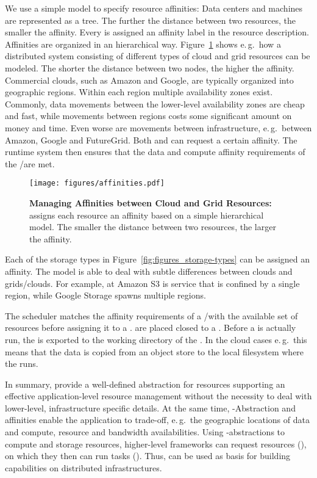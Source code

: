 \documentclass{sig-alternate}
\begin{document}
We use a simple model to specify resource affinities: Data centers and
machines are represented as a tree. The further the distance between two
resources, the smaller the affinity. Every \pilot is assigned an affinity
label in the resource description. Affinities are organized in an hierarchical
way. Figure~\ref{fig:figures_affinities} shows e.\,g.\ how a distributed
system consisting of different types of cloud and grid resources can be
modeled. The shorter the distance between two nodes, the higher the affinity.
Commercial clouds, such as Amazon and Google, are typically organized into
geographic regions. Within each region multiple availability zones exist.
Commonly, data movements between the lower-level availability zones are cheap
and fast, while movements between regions costs some significant amount on
money and time. Even worse are movements between infrastructure, e.\,g.\
between Amazon, Google and FutureGrid. Both \cus and \dus can request a
certain affinity. The runtime system then ensures that the data and compute
affinity requirements of the \cu/\du are met.


\begin{figure}[t]
	\centering
		\texttt{[image: figures/affinities.pdf]}
	\caption{\textbf{Managing Affinities between Cloud and Grid Resources:} 
	\pilotdata assigns each resource an affinity based on a simple 
	hierarchical model. The smaller the distance between two resources, the 
	larger the affinity.}
	\label{fig:figures_affinities}
\end{figure}

Each of the storage types in Figure~\ref{fig:figures_storage-types} can be 
assigned an affinity. The model is able to deal with subtle differences 
between clouds and grids/clouds. For example, at Amazon S3 is service that is 
confined by a single region, while Google Storage spawns multiple regions.

The \computedataservice scheduler matches the affinity requirements of
a \cu/\du with the available set of resources before assigning it to a
\pilot.  \cus are placed closed to a \du. Before a \cu is actually
run, the \du is exported to the working directory of the \cu. In the
cloud cases e.\,g.\ this means that the data is copied from an object
store to the local filesystem where the \cu runs.

In summary, \pilots provide a well-defined abstraction for resources
supporting an effective application-level resource management without the
necessity to deal with lower-level, infrastructure specific details. At the
same time, \pilot-Abstraction and affinities enable the application to
trade-off, e.\,g.\ the geographic locations of data and compute, resource and
bandwidth availabilities. Using \pilot-abstractions to compute and storage
resources, higher-level frameworks can request resources (\pilots), on
which they then can run tasks (\computeunits). Thus, \pilots can be used as
basis for building capabilities on distributed infrastructures.
\end{document}
